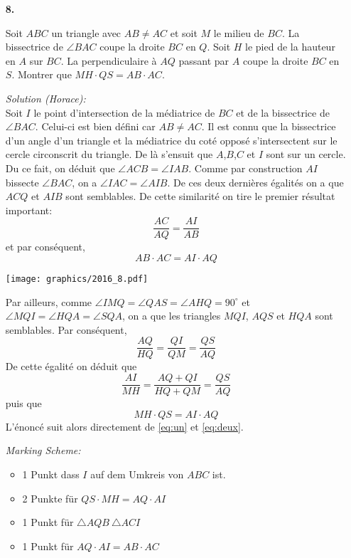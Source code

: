 \documentclass[language=german,style=solution]{smo}
\begin{document}
\begin{enumerate}
\newpage

\item[\textbf{8.}] %

Soit $ABC$ un triangle avec $AB\neq AC$ et soit $M$ le milieu de $BC$. La bissectrice de $\angle BAC$ coupe la droite $BC$ en $Q$. Soit $H$ le pied de la hauteur en $A$ sur $BC$. La perpendiculaire à $AQ$ passant par $A$ coupe la droite $BC$ en $S$. Montrer que $MH\cdot QS = AB \cdot AC$.

\textit{Solution (Horace):}\\
Soit $I$ le point d'intersection de la médiatrice de $BC$ et de la bissectrice de $\angle BAC$. Celui-ci est bien défini car $AB\neq AC$. Il est connu que la bissectrice d'un angle d'un triangle et la médiatrice du coté opposé s'intersectent sur le cercle circonscrit du triangle. De là s'ensuit que $A$,$B$,$C$ et $I$ sont sur un cercle. Du ce fait, on déduit que $\angle ACB= \angle IAB$. Comme par construction $AI$ bissecte $\angle BAC$, on a $\angle IAC=\angle AIB$. De ces deux dernières égalités on a que $ACQ$ et $AIB$ sont semblables. De cette similarité on tire le premier résultat important:
\[
\frac{AC}{AQ}=\frac{AI}{AB}
\]
et par conséquent,
\begin{equation}
	AB \cdot AC=AI \cdot AQ \label{eq:un}
\end{equation}

\texttt{[image: graphics/2016\_8.pdf]}

Par ailleurs, comme $\angle IMQ=\angle QAS=\angle AHQ=90^{\circ}$ et $\angle MQI=\angle HQA=\angle SQA$, on a que les triangles $MQI$, $AQS$ et $HQA$ sont semblables. Par conséquent,
\[
\frac{AQ}{HQ}=\frac{QI}{QM}=\frac{QS}{AQ}
\]
De cette égalité on déduit que
\[
\frac{AI}{MH}=\frac{AQ+QI}{HQ+QM}=\frac{QS}{AQ}
\]
puis que 
\begin{equation}
MH \cdot QS=AI \cdot AQ \label{eq:deux}
\end{equation}
L'énoncé suit alors directement de \eqref{eq:un} et \eqref{eq:deux}.

\textit{Marking Scheme:}
\begin{itemize}
	\item 1 Punkt dass $I$ auf dem Umkreis von $ABC$ ist.
	\item 2 Punkte für $QS \cdot MH = AQ \cdot AI$
	\item 1 Punkt für $\triangle AQB ~ \triangle ACI$
	\item 1 Punkt für $AQ \cdot AI = AB \cdot AC$
\end{itemize}


\end{enumerate}
\end{document}
